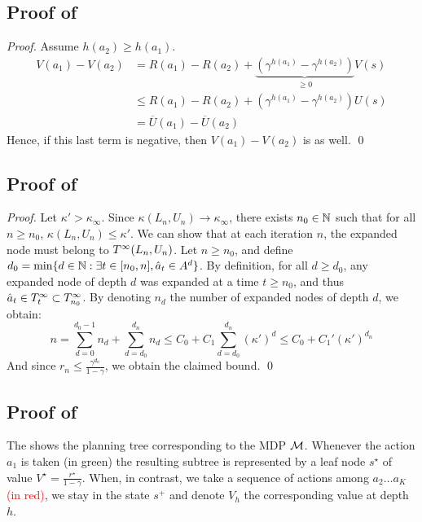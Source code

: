 \documentclass[runningheads]{llncs}
\begin{document}
\subsection{Proof of }

\begin{proof}
Assume $h(a_2) \geq h(a_1)$.
\begin{align*}
    V(a_1) - V(a_2) &= R(a_1)- R(a_2) + \underbrace{\left(\gamma^{h(a_1)} - \gamma^{h(a_2)}\right)}_{\geq 0}V(s) \\
    &\leq R(a_1)- R(a_2) + \left(\gamma^{h(a_1)} - \gamma^{h(a_2)}\right)U(s)\\
    &= \overline{U}(a_1) - \overline{U}(a_2)
\end{align*}
Hence, if this last term is negative, then $V(a_1) - V(a_2)$ is as well.
\qed\end{proof}

\subsection{Proof of }

\begin{proof}
Let $\kappa'>\kappa_\infty$. Since $\kappa(L_n,U_n)\rightarrow\kappa_\infty$, there exists $n_0\in\mathbb{N}$ such that for all $n\geq n_0$, $\kappa(L_n,U_n) \leq \kappa'$.
We can show that at each iteration $n$, the expanded node must belong to $T^\infty(L_n,U_n)$.
Let $n\geq n_0$, and define $d_0 = \min\{d\in\mathbb{N}: \exists t \in[n_0,n], \hat{a}_t\in A^d \}$. By definition, for all $d\geq d_0$, any expanded node of depth $d$ was expanded at a time $t\geq n_0$, and thus $\hat{a}_t\in T^\infty_t \subset T^\infty_{n_0}$. By denoting $n_d$ the number of expanded nodes of depth $d$, we obtain:
\[
n = \sum_{d=0}^{d_0-1}n_d + \sum_{d=d_0}^{d_n} n_d \leq  C_0 + C_1\sum_{d=d_0}^{d_n} (\kappa')^d \leq C_0 + C_1' (\kappa')^{d_n}
\]
And since $r_n \leq \frac{\gamma^{d_n}}{1-\gamma}$, we obtain the claimed bound.
\qed\end{proof}

\subsection{Proof of }

The  shows the planning tree corresponding to the MDP $\mathcal{M}$. Whenever the action $a_1$ is taken \textcolor{OliveGreen}{(in green)} the resulting subtree is represented by a leaf node $s^\star$ of value $V^\star = \frac{r^\star}{1-\gamma}$. When, in contrast, we take a sequence of actions among $a_2\dots a_K$ \textcolor{red}{(in red)}, we stay in the state $s^+$ and denote $V_h$ the corresponding value at depth $h$.
\end{document}
